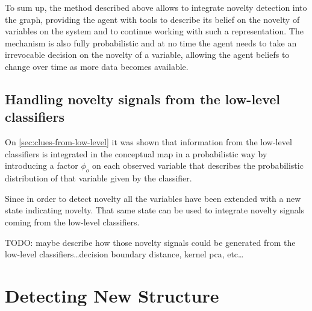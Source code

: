 To sum up, the method described above allows to integrate novelty detection
into the graph, providing the agent with tools to describe its belief on the
novelty of variables on the system and to continue working with such a
representation. The mechanism is also fully probabilistic and at no time
the agent needs to take an irrevocable decision on the novelty of a variable,
allowing the agent beliefs to change over time as more data becomes available.


\subsection{Handling novelty signals from the low-level classifiers}
On \autoref{sec:clues-from-low-level} it was shown that information from the
low-level classifiers is integrated in the conceptual map in a probabilistic
way by introducing a factor $\phi_o$ on each observed variable that describes
the probabilistic distribution of that variable given by the classifier.

Since in order to detect novelty all the variables have been extended with a
new state indicating novelty. That same state can be used to integrate novelty
signals coming from the low-level classifiers.

TODO: maybe describe how those novelty signals could be generated from the
low-level classifiers\dots decision boundary distance, kernel pca, etc\dots


\section{Detecting New Structure}

